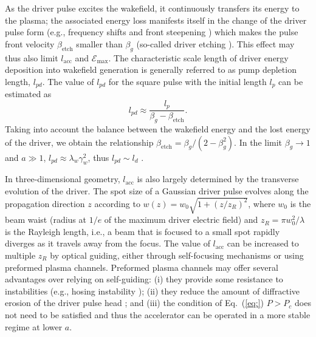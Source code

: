 \documentclass[10pt, a4paper, twoside, openright]{report}
\begin{document}
As the driver pulse excites the wakefield, it continuously transfers its energy to the plasma; the associated energy loss manifests itself in the change of the driver pulse form (e.g., frequency shifts \cite{Esarey1990, Shadwick2009} and front steepening \cite{Bulanov1992, Esarey2000, Gordon2003}) which makes the pulse front velocity $ \beta_{\mathrm{etch}} $ smaller than $ \beta_g $ (so-called driver etching \cite{Nakajima2011}). This effect may thus also limit $ l_{\mathrm{acc}} $ and $ \mathcal{E}_{\mathrm{max}} $. The characteristic scale length of driver energy deposition into wakefield generation is generally referred to as pump depletion length, $ l_{pd} $. The value of $ l_{pd} $ for the square pulse with the initial length $ l_p $ can be estimated as \cite{Bulanov2016}
\begin{equation}\label{key}
	l_{pd} \approx \frac{l_p}{\beta_g - \beta_{\mathrm{etch}}}.
\end{equation}
Taking into account the balance between the wakefield energy and the lost energy of the driver, we obtain the relationship $ \beta_{\mathrm{etch}} = \beta_g / \left( 2 - \beta_g^2 \right) $. In the limit $ \beta_g \rightarrow 1 $ and $ a \gg 1 $, $ l_{pd} \approx \lambda_w \gamma_w^2 $, thus $ l_{pd} \sim l_d $ \cite{Bulanov2016}.

In three-dimensional geometry, $ l_{\mathrm{acc}} $ is also largely determined by the transverse evolution of the driver. The spot size of a Gaussian driver pulse evolves along the propagation direction $ z $ according to $ w \left( z \right) = w_0 \sqrt{1 + \left( z / z_R \right)^2} $, where $ w_0 $ is the beam waist (radius at $ 1 / e $ of the maximum driver electric field) and $ z_R = \pi w_0^2 / \lambda $ is the Rayleigh length, i.e., a beam that is focused to a small spot rapidly diverges as it travels away from the focus. The value of $ l_{\mathrm{acc}} $ can be increased to multiple $ z_{R} $ by optical guiding, either through self-focusing mechanisms or using preformed plasma channels. Preformed plasma channels may offer several advantages over relying on self-guiding: (i) they provide some resistance to instabilities (e.g., hosing instability \cite{Shvets1994, Sprangle1994}); (ii) they reduce the amount of diffractive erosion of the driver pulse head \cite{Sprangle1990, Esarey1997}; and (iii) the condition of Eq.~(\ref{eq:}) $ P > P_c $ does not need to be satisfied and thus the accelerator can be operated in a more stable regime at lower $ a $.
\end{document}
